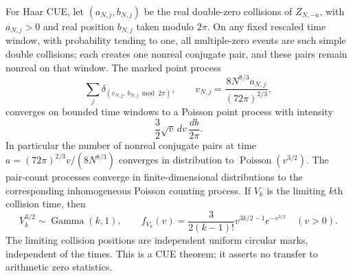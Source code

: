 \begin{theorem}
\label{thm:analytic-cue-collision-process}
For Haar CUE, let $(a_{N,j},b_{N,j})$ be the real double-zero
collisions of $Z_{N,-a}$, with $a_{N,j}>0$ and real position
$b_{N,j}$ taken modulo $2\pi$. On any fixed rescaled time
window, with probability tending to one, all multiple-zero
events are such simple double collisions; each creates one
nonreal conjugate pair, and these pairs remain nonreal on that
window. The marked point process
\[
 \sum_j\delta_{(v_{N,j},\,b_{N,j}\bmod2\pi)},
 \qquad v_{N,j}=\frac{8N^{8/3}a_{N,j}}{(72\pi)^{2/3}},
\]
converges on bounded time windows to a Poisson point process
with intensity
\begin{equation}\label{eq:analytic-collision-ppp-intensity}
                   \frac32\sqrt v\,dv\,\frac{db}{2\pi}.
\end{equation}
In particular the number of nonreal conjugate pairs at time
$a=(72\pi)^{2/3}v/(8N^{8/3})$ converges in distribution to
$\operatorname{Poisson}(v^{3/2})$. The pair-count processes
converge in finite-dimensional distributions to the corresponding
inhomogeneous Poisson counting process. If $V_k$ is the limiting
$k$th collision time, then
\[
 V_k^{3/2}\sim\operatorname{Gamma}(k,1),\qquad
 f_{V_k}(v)=\frac{3}{2(k-1)!}
                       v^{3k/2-1}e^{-v^{3/2}}\quad(v>0).
\]
The limiting collision positions are independent uniform circular
marks, independent of the times. This is a CUE theorem; it
asserts no transfer to arithmetic zero statistics.
\end{theorem}

